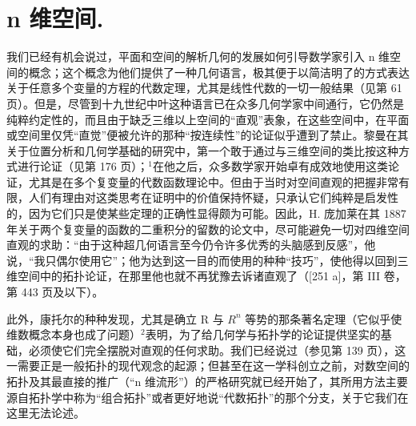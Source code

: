 \chapter{n 维空间.}

我们已经有机会说过，平面和空间的解析几何的发展如何引导数学家引入 n 维空间的概念；这个概念为他们提供了一种几何语言，极其便于以简洁明了的方式表达关于任意多个变量的方程的代数定理，尤其是线性代数的一切一般结果（见第 61 页）。但是，尽管到十九世纪中叶这种语言已在众多几何学家中间通行，它仍然是纯粹约定性的，而且由于缺乏三维以上空间的“直观”表象，在这些空间中，在平面或空间里仅凭“直觉”便被允许的那种“按连续性”的论证似乎遭到了禁止。黎曼在其关于位置分析和几何学基础的研究中，第一个敢于通过与三维空间的类比按这种方式进行论证（见第 176 页）；\(^{1}\)在他之后，众多数学家开始卓有成效地使用这类论证，尤其是在多个复变量的代数函数理论中。但由于当时对空间直观的把握非常有限，人们有理由对这类思考在证明中的价值保持怀疑，只承认它们纯粹是启发性的，因为它们只是使某些定理的正确性显得颇为可能。因此，H. 庞加莱在其 1887 年关于两个复变量的函数的二重积分的留数的论文中，尽可能避免一切对四维空间直观的求助：“由于这种超几何语言至今仍令许多优秀的头脑感到反感”，他说，“我只偶尔使用它”；他为达到这一目的而使用的种种“技巧”，使他得以回到三维空间中的拓扑论证，在那里他也就不再犹豫去诉诸直观了（{[}251 a{]}，第 III 卷，第 443 页及以下）。

此外，康托尔的种种发现，尤其是确立 R 与 \(R^{n}\) 等势的那条著名定理（它似乎使维数概念本身也成了问题）\(^{2}\)表明，为了给几何学与拓扑学的论证提供坚实的基础，必须使它们完全摆脱对直观的任何求助。我们已经说过（参见第 139 页），这一需要正是一般拓扑的现代观念的起源；但甚至在这一学科创立之前，对数空间的拓扑及其最直接的推广（“n 维流形”）的严格研究就已经开始了，其所用方法主要源自拓扑学中称为“组合拓扑”或者更好地说“代数拓扑”的那个分支，关于它我们在这里无法论述。
\relax{}

